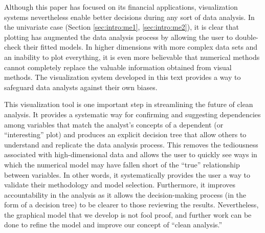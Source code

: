 
Although this paper has focused on its financial applications, visualization
systems nevertheless enable better decisions during any sort of data analysis.
In the univariate case (Section \ref{sec:intro:me1}, \ref{sec:intro:me2}), it is
clear that plotting has augmented the data analysis process by allowing the user
to double-check their fitted models. In higher dimensions with more complex data
sets and an inability to plot everything, it is even more believable that
numerical methods cannot completely replace the valuable information obtained
from visual methods. The visualization system developed in this text provides a
way to safeguard data analysts against their own biases.

This visualization tool is one important step in streamlining the future of
clean analysis. It provides a systematic way for confirming and suggesting
dependencies among variables that match the analyst's concepts of a dependent
(or ``interesting'' plot) and produces an explicit decision tree that allow
others to understand and replicate the data analysis process. This removes the
tediousness associated with high-dimensional data and allows the user to quickly
see ways in which the numerical model may have fallen short of the ``true''
relationship between variables. In other words, it systematically provides the
user a way to validate their methodology and model selection. Furthermore, it
improves accountability in the analysis as it allows the decision-making process
(in the form of a decision tree) to be clearer to those reviewing the results.
Nevertheless, the graphical model that we develop is not fool proof, and further
work can be done to refine the model and improve our concept of ``clean
analysis.''